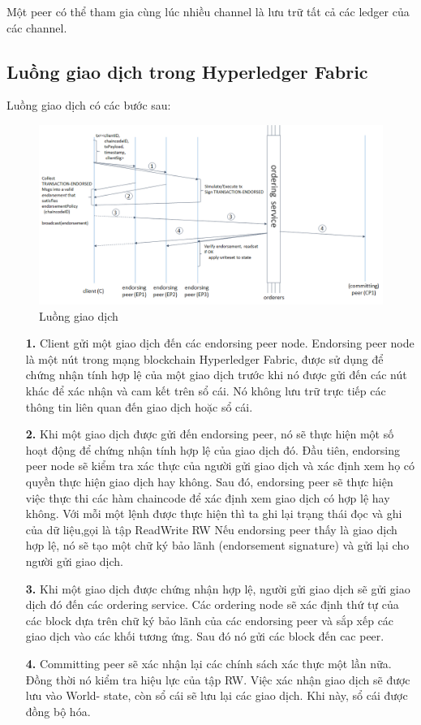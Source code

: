 Một peer có thể tham gia cùng lúc nhiều channel là lưu trữ tất cả các ledger của các channel.


\subsection{Luồng giao dịch trong Hyperledger Fabric}

Luồng giao dịch có các bước sau:
\begin{figure}[h]
    \centering
    \includegraphics[width=1\textwidth]{images/flow-4.png}
    \caption{Luồng giao dịch }
\end{figure}


\begin{itemize}
    \item[\textbf{1.}] Client gửi một giao dịch đến các endorsing peer node. Endorsing peer node là 
    một nút trong mạng blockchain Hyperledger Fabric, được sử dụng để chứng nhận tính hợp 
    lệ của một giao dịch trước khi nó được gửi đến các nút khác để xác nhận và cam kết trên 
    sổ cái. Nó không lưu trữ trực tiếp các thông tin liên quan đến giao dịch hoặc sổ cái.
    \item[\textbf{2.}] Khi một giao dịch được gửi đến endorsing peer, nó sẽ thực hiện một số hoạt 
    động để chứng nhận tính hợp lệ của giao dịch đó. Đầu tiên, endorsing peer node sẽ kiểm 
    tra xác thực của người gửi giao dịch và xác định xem họ có quyền thực hiện giao dịch hay 
    không. Sau đó, endorsing peer sẽ thực hiện việc thực thi các hàm chaincode để xác 
    định xem giao dịch có hợp lệ hay không. Với mỗi một lệnh được thực hiện thì ta ghi lại 
    trạng thái đọc và ghi của dữ liệu,gọi là tập ReadWrite RW
    Nếu endorsing peer thấy là giao dịch hợp lệ, nó sẽ tạo một chữ ký bảo lãnh (endorsement signature) và gửi lại cho người 
    gửi giao dịch. 
    \item[\textbf{3.}] Khi một giao dịch được chứng nhận hợp lệ, người gửi giao dịch sẽ gửi giao dịch
    đó đến các ordering service. Các ordering node sẽ xác định thứ tự của các block dựa trên 
    chữ ký bảo lãnh của các endorsing peer và sắp xếp các giao dịch vào các khối tương 
    ứng. Sau đó nó gửi các block đến cac peer.
    \item[\textbf{4.}] Committing peer sẽ xác nhận lại các chính sách xác thực một lần nữa. 
    Đồng thời nó kiểm tra hiệu lực của tập RW. Việc xác nhận giao dịch sẽ được lưu vào World- state, còn sổ cái sẽ lưu lại các giao dịch. Khi này, sổ cái được đồng bộ hóa.
\end{itemize}
